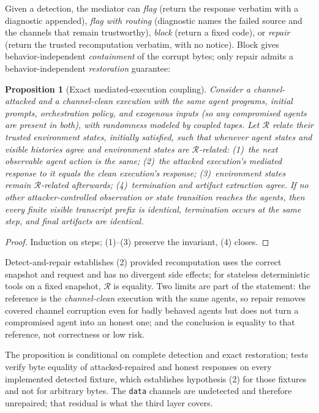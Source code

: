 \documentclass[conference]{IEEEtran}
\newtheorem{proposition}{Proposition}
\begin{document}
Given a detection, the mediator can \emph{flag} (return the response
verbatim with a diagnostic appended), \emph{flag with routing}
(diagnostic names the failed source and the channels that remain
trustworthy), \emph{block} (return a fixed code), or \emph{repair}
(return the trusted recomputation verbatim, with no notice). Block
gives behavior-independent \emph{containment} of the corrupt bytes;
only repair admits a behavior-independent \emph{restoration}
guarantee:

\begin{proposition}[Exact mediated-execution coupling]\label{prop:repair}
Consider a channel-attacked and a channel-clean execution with the
\emph{same} agent programs, initial prompts, orchestration policy, and
exogenous inputs (so any compromised agents are present in both), with
randomness modeled by coupled tapes. Let $\mathcal R$ relate their
trusted environment states, initially satisfied, such that whenever
agent states and visible histories agree and environment states are
$\mathcal R$-related: (1)~the next observable agent action is the
same; (2)~the attacked execution's mediated response to it equals the
clean execution's response; (3)~environment states remain
$\mathcal R$-related afterwards; (4)~termination and artifact
extraction agree. If no other attacker-controlled observation or state
transition reaches the agents, then every finite visible transcript
prefix is identical, termination occurs at the same step, and final
artifacts are identical.
\end{proposition}
\begin{proof}
Induction on steps; (1)--(3) preserve the invariant, (4) closes.
\end{proof}
Detect-and-repair establishes (2) provided recomputation uses the
correct snapshot and request and has no divergent side effects; for
stateless deterministic tools on a fixed snapshot, $\mathcal R$ is
equality. Two limits are part of the statement: the reference is the
\emph{channel-clean} execution with the same agents, so repair removes
covered channel corruption even for badly behaved agents but does not
turn a compromised agent into an honest one; and the conclusion is
equality to that reference, not correctness or low risk.

The proposition is conditional on complete detection and exact
restoration; tests verify byte equality of attacked-repaired and honest
responses on every implemented detected fixture, which establishes
hypothesis (2) for those fixtures and not for arbitrary bytes. The
\texttt{data} channels are undetected and therefore unrepaired; that
residual is what the third layer covers.
\end{document}
